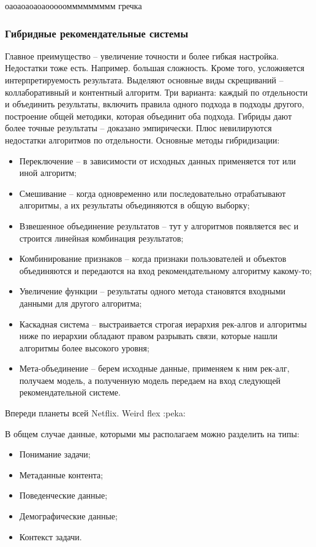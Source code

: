 оаоаоаоаоаоооооммммммммм гречка

\subsubsection{Гибридные рекомендательные системы}

Главное преимущество -- увеличение точности и более гибкая настройка. Недостатки тоже есть. Например. большая сложность. Кроме того, усложняется интерпретируемость результата. Выделяют основные виды скрещиваний -- коллаборативный и контентный алгоритм. Три варианта: каждый по отдельности и объединить результаты, включить правила одного подхода в подходы другого, построение общей методики, которая объединит оба подхода. Гибриды дают более точные результаты -- доказано эмпирически. Плюс невилируются недостатки алгоритмов по отдельности. Основные методы гибридизации:
\begin{itemize}
    \item Переключение -- в зависимости от исходных данных применяется тот или иной алгоритм;
    \item Смешивание -- когда одновременно или последовательно отрабатывают алгоритмы, а их результаты объединяются в общую выборку;
    \item Взвешенное объединение результатов -- тут у алгоритмов появляется вес и строится линейная комбинация результатов;
    \item Комбинирование признаков -- когда признаки пользователей и объектов объединяются и передаются на вход рекомендательному алгоритму какому-то;
    \item Увеличение функции -- результаты одного метода становятся входными данными для другого алгоритма;
    \item Каскадная система -- выстраивается строгая иерархия рек-алгов и алгоритмы ниже по иерархии обладают правом разрывать связи, которые нашли алгоритмы более высокого уровня;
    \item Мета-объединение -- берем исходные данные, применяем к ним рек-алг, получаем модель, а полученную модель передаем на вход следующей рекомендательной системе.
\end{itemize}

Впереди планеты всей Netflix. Weird flex :peka:

В общем случае данные, которыми мы располагаем можно разделить на типы:
\begin{itemize}
    \item Понимание задачи;
    \item Метаданные контента;
    \item Поведенческие данные;
    \item Демографические данные;
    \item Контекст задачи.
\end{itemize}

